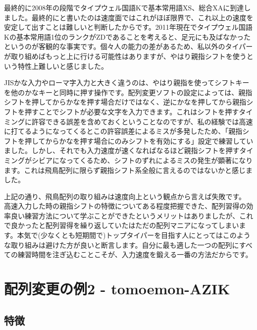 最終的に2008年の段階でタイプウェル国語Kで基本常用語XS、総合XAに到達しました。最終的にと書いたのは速度面ではこれがほぼ限界で、これ以上の速度を安定して出すことは難しいと判断したからです。2011年現在でタイプウェル国語Kの基本常用語1位のランクがZDであることを考えると、足元にも及ばなかったというのが客観的な事実です。個々人の能力の差があるため、私以外のタイパーが取り組めばもっと上に行ける可能性はありますが、やはり親指シフトを使うという特性上難しいと感じました。

JISかな入力やローマ字入力と大きく違うのは、やはり親指を使ってシフトキーを他のかなキーと同時に押す操作です。配列変更ソフトの設定によっては、親指シフトを押してからかなを押す場合だけではなく、逆にかなを押してから親指シフトを押すことでシフトが必要な文字を入力できます。これはシフトを押すタイミングに許容できる誤差を含めておくということなのですが、私の経験では高速に打てるようになってくるとこの許容誤差によるミスが多発したため、「親指シフトを押してからかなを押す場合にのみシフトを有効にする」設定で練習していました。しかし、それでも入力速度が速くなればなるほど親指シフトを押すタイミングがシビアになってくるため、シフトのずれによるミスの発生が顕著になります。これは飛鳥配列に限らず親指シフト系全般に言えるのではないかと感じました。

上記の通り、飛鳥配列の取り組みは速度向上という観点から言えば失敗です。
高速入力した時の親指シフトの特徴についてある程度把握できた、配列習得の効率良い練習方法について学ぶことができたというメリットはありましたが、これで良かったと配列習得を繰り返していたはただの配列マニアになってしまいます。本気で(少なくとも短期間で)トップタイパーを目指す人にとってはこのような取り組みは避けた方が良いと断言します。自分に最も適した一つの配列にすべての練習時間を注ぎ込むことこそが、入力速度を鍛える一番の方法だからです。


\section{配列変更の例2 - tomoemon-AZIK}

\subsection{特徴}

